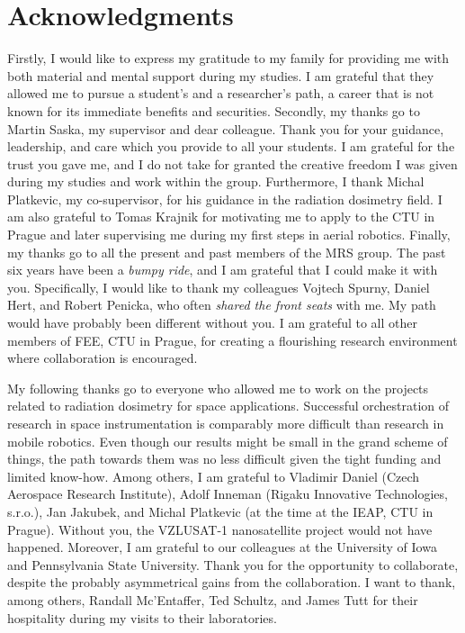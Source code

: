 
\section*{Acknowledgments}

Firstly, I would like to express my gratitude to my family for providing me with both material and mental support during my studies.
I am grateful that they allowed me to pursue a student's and a researcher's path, a career that is not known for its immediate benefits and securities.
Secondly, my thanks go to Martin Saska, my supervisor and dear colleague.
Thank you for your guidance, leadership, and care which you provide to all your students.
I am grateful for the trust you gave me, and I do not take for granted the creative freedom I was given during my studies and work within the group.
Furthermore, I thank Michal Platkevic, my co-supervisor, for his guidance in the radiation dosimetry field.
I am also grateful to Tomas Krajnik for motivating me to apply to the CTU in Prague and later supervising me during my first steps in aerial robotics.
Finally, my thanks go to all the present and past members of the MRS group.
The past six years have been a \emph{bumpy ride}, and I am grateful that I could make it with you.
Specifically, I would like to thank my colleagues Vojtech Spurny, Daniel Hert, and Robert Penicka, who often \emph{shared the front seats} with me.
My path would have probably been different without you.
I am grateful to all other members of FEE, CTU in Prague, for creating a flourishing research environment where collaboration is encouraged.

My following thanks go to everyone who allowed me to work on the projects related to radiation dosimetry for space applications.
Successful orchestration of research in space instrumentation is comparably more difficult than research in mobile robotics.
Even though our results might be small in the grand scheme of things, the path towards them was no less difficult given the tight funding and limited know-how.
Among others, I am grateful to Vladimir Daniel (Czech Aerospace Research Institute), Adolf Inneman (Rigaku Innovative Technologies, s.r.o.), Jan Jakubek, and Michal Platkevic (at the time at the IEAP, CTU in Prague).
Without you, the VZLUSAT-1 nanosatellite project would not have happened.
Moreover, I am grateful to our colleagues at the University of Iowa and Pennsylvania State University.
Thank you for the opportunity to collaborate, despite the probably asymmetrical gains from the collaboration.
I want to thank, among others, Randall Mc'Entaffer, Ted Schultz, and James Tutt for their hospitality during my visits to their laboratories.

